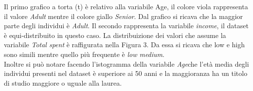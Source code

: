 \documentclass[letterpaper,11pt]{article}
\begin{document}
Il primo grafico a torta (t) è relativo alla variabile Age, il colore viola rappresenta il valore \textit{Adult} mentre il colore giallo \textit{Senior}. Dal grafico si ricava che la maggior parte degli individui è \textit{Adult}.
Il secondo rappresenta la variabile \textit{income}, il dataset è equi-distribuito in questo caso.
La distribuizione dei valori che assume la variabile \textit{Total spent} è raffigurata nella Figura 3. Da essa si ricava che low e high sono simili mentre quello più frequente è \textit{low medium}.\\
Inoltre si può notare facendo l'istogramma della variabile \textit{Age}che l'età media degli individui presenti nel dataset è superiore ai 50 anni e la maggioranza ha un titolo di studio maggiore o uguale alla laurea.


\begin{figure}[H]
     \begin{center}
%
\end{center}
\end{figure}
\end{document}
